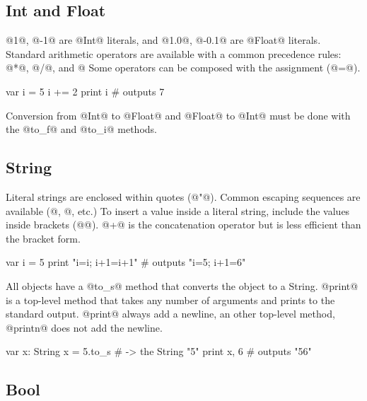 \subsection{Int and Float}\label{Int}\label{Float}

@1@, @-1@ are @Int@ literals, and @1.0@, @-0.1@ are @Float@ literals.
Standard arithmetic operators are available with a common precedence rules: @*@, @/@, and @%
Some operators can be composed with the assignment (@=@). 
\begin{lst}
var i = 5
i += 2
print i # outputs 7
\end{lst}

Conversion from @Int@ to @Float@ and @Float@ to @Int@ must be done with the @to_f@ and @to_i@ methods.

\subsection{String}\label{String}

Literal strings are enclosed within quotes (@"@).
Common escaping sequences are available (@\n@, @\t@, etc.)
To insert a value inside a literal string, include the values inside brackets (@{}@).
@+@ is the concatenation operator but is less efficient than the bracket form.

\begin{lst}
var i = 5
print "i={i}; i+1={i+1}" # outputs "i=5; i+1=6"
\end{lst}

All objects have a @to_s@ method that converts the object to a String.
@print@ is a top-level method that takes any number of arguments and prints to the standard output.
@print@ always add a newline, an other top-level method, @printn@ does not add the newline.

\begin{lst}
var x: String
x = 5.to_s # -> the String "5"
print x, 6 # outputs "56"
\end{lst}

\subsection{Bool}\label{Bool}\label{is}

